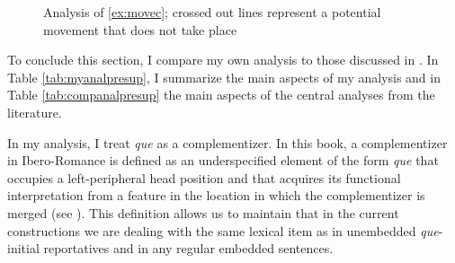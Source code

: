 \begin{figure}
\caption{\label{struc:movec}Analysis of \eqref{ex:movec}; crossed out lines represent a potential  movement that does not take place}
\end{figure}


To conclude this section, I compare my own analysis to those discussed in . In Table \ref{tab:myanalpresup}, I summarize the main aspects of my  analysis and in Table \ref{tab:companalpresup} the main aspects of the central analyses from the literature. 

In my analysis,  I treat \emph{que}  as a complementizer. In this book, a  complementizer in Ibero-Romance is defined as an underspecified element of the form \emph{que} that occupies a left-peripheral head position and that acquires its functional interpretation from a feature in the location in which the complementizer is merged  (see ). This definition allows us to maintain  that in the current constructions we are dealing with the same lexical item as in unembedded \emph{que}-initial reportatives and in any regular embedded sentences. 

